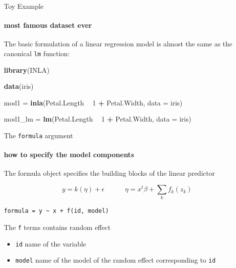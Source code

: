 \documentclass[9pt,ignorenonframetext,]{beamer}
\newenvironment{Shaded}{\begin{snugshade}}{\end{snugshade}}
\newcommand{\DataTypeTok}[1]{\textcolor[rgb]{0.13,0.29,0.53}{#1}}
\newcommand{\DecValTok}[1]{\textcolor[rgb]{0.00,0.00,0.81}{#1}}
\newcommand{\KeywordTok}[1]{\textcolor[rgb]{0.13,0.29,0.53}{\textbf{#1}}}
\newcommand{\NormalTok}[1]{#1}
\newcommand{\OperatorTok}[1]{\textcolor[rgb]{0.81,0.36,0.00}{\textbf{#1}}}
\newcommand{\StringTok}[1]{\textcolor[rgb]{0.31,0.60,0.02}{#1}}
\providecommand{\tightlist}{%
  \setlength{\itemsep}{0pt}\setlength{\parskip}{0pt}}
\begin{document}
\begin{frame}[fragile]{Toy Example}
\protect\hypertarget{toy-example}{}

\framesubtitle{most famous dataset ever}

The basic formulation of a linear regression model is almost the same as
the canonical \texttt{lm} function:

\begin{Shaded}
\begin{Highlighting}[]
\KeywordTok{library}\NormalTok{(INLA)}

\KeywordTok{data}\NormalTok{(iris)}

\NormalTok{mod1  =}\StringTok{ }\KeywordTok{inla}\NormalTok{(Petal.Length }\OperatorTok{~}\StringTok{ }\DecValTok{1} \OperatorTok{+}\StringTok{ }\NormalTok{Petal.Width, }\DataTypeTok{data =}\NormalTok{ iris)}

\NormalTok{mod1_lm =}\StringTok{ }\KeywordTok{lm}\NormalTok{(Petal.Length }\OperatorTok{~}\StringTok{ }\DecValTok{1} \OperatorTok{+}\StringTok{ }\NormalTok{Petal.Width, }\DataTypeTok{data =}\NormalTok{ iris)}
\end{Highlighting}
\end{Shaded}

\end{frame}

\begin{frame}[fragile]{The \texttt{formula} argument}
\protect\hypertarget{the-formula-argument}{}

\framesubtitle{how to specify the model components}

The formula object specifies the building blocks of the linear predictor

\[y= k(\eta) + \epsilon  \qquad \quad \eta = x^t\beta + \sum_k f_k(z_k)\]

\begin{verbatim}
formula = y ~ x + f(id, model)
\end{verbatim}

\vspace{0.25cm}

The \texttt{f} terms contains random effect

\begin{itemize}
\tightlist
\item
  \texttt{id} name of the variable
\item
  \texttt{model} name of the model of the random effect corresponding to
  \texttt{id}
\end{itemize}

\end{frame}
\end{document}
